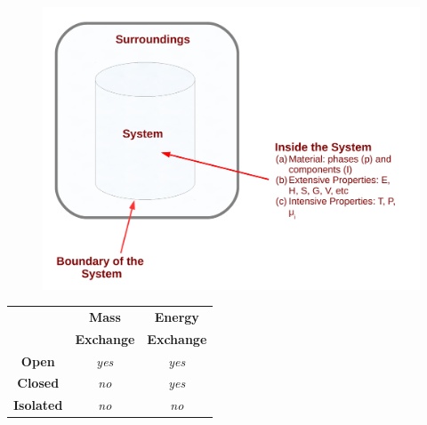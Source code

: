 \documentclass[10pt,compress]{beamer}
\begin{document}
\begin{frame}
\begin{columns}
\begin{column}[l]{0.4\linewidth}
\begin{figure}
\begin{center}
          \includegraphics[width=\columnwidth,clip]{./Pics/Fig_SystemDefinition}
        \end{center}
      \end{figure}
      \begin{tabular}{|c|c|c|}
         \hline
                      & {\bf Mass} & {\bf Energy} \\
                      & {\bf Exchange} & {\bf Exchange} \\
         \hline
         {\bf Open}   & {\it yes}  & {\it yes}    \\
         {\bf Closed} & {\it no}   & {\it yes}    \\
         {\bf Isolated}&{\it no}   & {\it no}     \\
         \hline 
      \end{tabular}    
    \end{column}
  \end{columns}
\end{frame}
\normalsize
\end{document}
